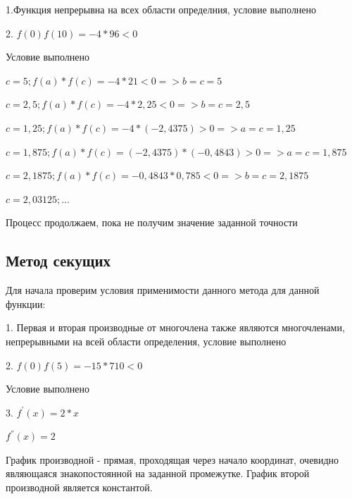 1.Функция непрерывна на всех области определния, условие выполнено

2. \begin{math}
	f(0)f(10)=-4*96<0 
\end{math}

Условие выполнено 

\begin{math}
	c=5; f(a)*f(c)=-4*21<0 => b=c=5
\end{math}

\begin{math}
	c=2,5; f(a)*f(c)=-4*2,25<0 => b=c=2,5
\end{math}

\begin{math}
	c=1,25; f(a)*f(c)=-4*(-2,4375)>0 => a=c=1,25
\end{math}

\begin{math}
	c=1,875; f(a)*f(c)=(-2,4375)*(-0,4843)>0 => a=c=1,875
\end{math}

\begin{math}
	c=2,1875; f(a)*f(c)=-0,4843*0,785<0 => b=c=2,1875
\end{math}

\begin{math}
	c=2,03125; ... 
\end{math}

Процесс продолжаем, пока не получим значение заданной точности 
\subsection {Метод секущих}

Для начала проверим условия применимости данного метода для данной функции: 

1. Первая и вторая производные от многочлена также являются многочленами, непрерывными на всей области определения, условие выполнено

2.  \begin{math}
	f(0)f(5)=-15*710<0 
\end{math}

Условие выполнено

3. \begin{math}
	f^{'}(x)=2*x
\end{math}

\begin{math}
	f^{''}(x)=2
\end{math}

График производной - прямая, проходящая через начало координат, очевидно являющаяся знакопостоянной на заданной промежутке. График второй производной является константой. 


